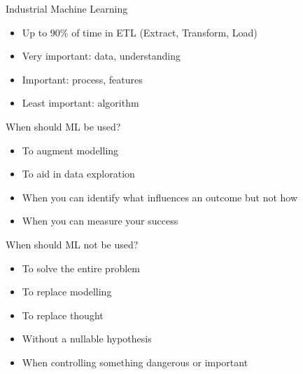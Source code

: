 \documentclass{beamer}
\begin{document}
\begin{frame}{Industrial Machine Learning}

\begin{itemize}
  \item Up to 90\% of time in ETL (Extract, Transform, Load)
  \item Very important: data, understanding
  \item Important: process, features
  \item Least important: algorithm
\end{itemize}

\end{frame}

\begin{frame}{When should ML be used?}
  \begin{itemize}
  \item To augment modelling
  \item To aid in data exploration
  \item When you can identify \alert{what} influences an outcome but not \alert{how}
  \item When you can measure your success
  \end{itemize}
\end{frame}

\begin{frame}{When should ML \alert{not} be used?}
  \begin{itemize}
  \item To solve the entire problem
  \item To replace modelling
  \item To replace thought
  \item Without a \alert{nullable} hypothesis
  \item When controlling something dangerous or important
  \end{itemize}

\end{frame}
\end{document}
